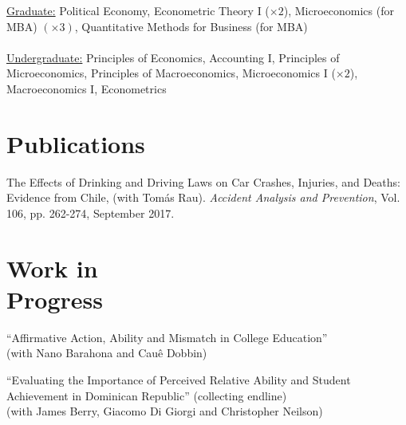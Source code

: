 \documentclass[margin,line]{res}
\begin{document}
\begin{resume}
\vspace{-.3cm}
\underline{Graduate:} Political Economy, Econometric Theory I ($\times 2$),  Microeconomics (for MBA) $(\times3)$, Quantitative Methods for Business (for MBA)\\
\vspace{-.2cm}
\\
\underline{Undergraduate:} Principles of Economics, Accounting I, Principles of Microeconomics,  Principles of Macroeconomics, Microeconomics I ($\times 2$), Macroeconomics I, Econometrics\\




\section{\sc Publications}
The Effects of Drinking and Driving Laws on Car Crashes, Injuries, and Deaths: Evidence from Chile, (with Tom\'as Rau). {\it Accident Analysis and Prevention}, Vol. 106, pp. 262-274, September 2017.    
 
\section{\sc Work in \\Progress}

``Affirmative Action, Ability and Mismatch in College Education'' \\
(with Nano Barahona and Cau\^e Dobbin)

``Evaluating the Importance of Perceived Relative Ability and Student Achievement in Dominican Republic''  (collecting endline)\\
(with James Berry, Giacomo Di Giorgi and Christopher Neilson)


\end{resume}
\end{document}
